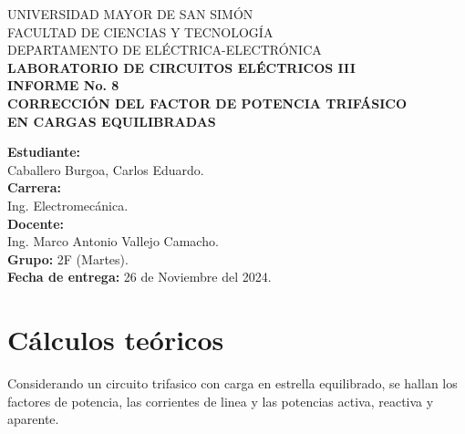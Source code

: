 \documentclass[letter,11pt]{article}
\begin{document}
\begin{titlepage}
    \begin{center}
        {\Large UNIVERSIDAD MAYOR DE SAN SIMÓN}\\
        \vspace*{0.15cm}
        {\large FACULTAD DE CIENCIAS Y TECNOLOGÍA}\\
        \vspace*{0.10cm}
        DEPARTAMENTO DE ELÉCTRICA-ELECTRÓNICA\\
        \vspace*{3.0cm}
        {\Large \textbf{LABORATORIO DE CIRCUITOS ELÉCTRICOS III}}\\
        \vspace*{0.3cm}
        {\Large \textbf{INFORME No. 8}}\\
        \vspace*{3.5cm}
        {\Large \textbf{CORRECCIÓN DEL FACTOR DE POTENCIA TRIFÁSICO\\
        EN CARGAS EQUILIBRADAS}}\\
    \end{center}

    \vspace*{5.3cm}
    \leftskip=7.95cm
    \noindent
    \textbf{Estudiante:}\\
    Caballero Burgoa, Carlos Eduardo.\\
    \newline
    \textbf{Carrera:}\\
    Ing. Electromecánica.\\
    \newline
    \textbf{Docente:}\\
    Ing. Marco Antonio Vallejo Camacho.\\
    \newline
    \textbf{Grupo:} 2F (Martes).\\
\textbf{Fecha de entrega:} 26 de Noviembre del 2024.\\
\end{titlepage}

\section{Cálculos teóricos}
Considerando un circuito trifasico con carga en estrella equilibrado, se hallan
los factores de potencia, las corrientes de linea y las potencias activa,
reactiva y aparente.
\end{document}
